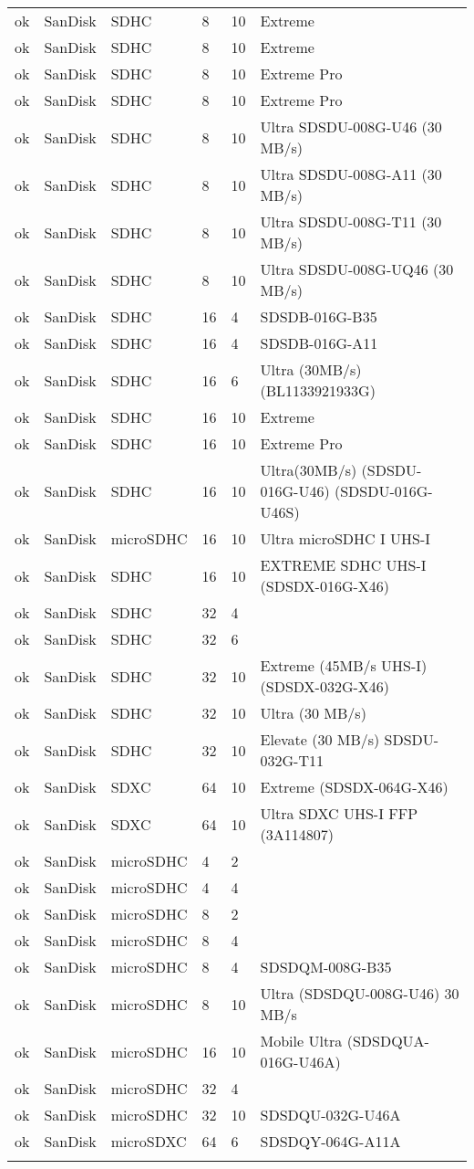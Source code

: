 \begin{longtable}{llllp{}p{}}
  ok&SanDisk&SDHC&8&10&Extreme\\
  ok&SanDisk&SDHC&8&10&Extreme\\
  ok&SanDisk&SDHC&8&10&Extreme Pro\\
  ok&SanDisk&SDHC&8&10&Extreme Pro\\
  ok&SanDisk&SDHC&8&10&Ultra SDSDU-008G-U46 (30 MB/s)\\
  ok&SanDisk&SDHC&8&10&Ultra SDSDU-008G-A11 (30 MB/s)\\
  ok&SanDisk&SDHC&8&10&Ultra SDSDU-008G-T11 (30 MB/s)\\
  ok&SanDisk&SDHC&8&10&Ultra SDSDU-008G-UQ46 (30 MB/s)\\
  ok&SanDisk&SDHC&16&4&SDSDB-016G-B35\\
  ok&SanDisk&SDHC&16&4&SDSDB-016G-A11\\
  ok&SanDisk&SDHC&16&6&Ultra (30MB/s) (BL1133921933G)\\
  ok&SanDisk&SDHC&16&10&Extreme\\
  ok&SanDisk&SDHC&16&10&Extreme Pro\\
  ok&SanDisk&SDHC&16&10&Ultra(30MB/s) (SDSDU-016G-U46) (SDSDU-016G-U46S)\\
  ok&SanDisk&microSDHC&16&10&Ultra microSDHC I UHS-I\\
  ok&SanDisk&SDHC&16&10&EXTREME SDHC UHS-I (SDSDX-016G-X46)\\
  ok&SanDisk&SDHC&32&4\\
  ok&SanDisk&SDHC&32&6\\
  ok&SanDisk&SDHC&32&10&Extreme (45MB/s UHS-I) (SDSDX-032G-X46)\\
  ok&SanDisk&SDHC&32&10&Ultra (30 MB/s)\\
  ok&SanDisk&SDHC&32&10&Elevate (30 MB/s) SDSDU-032G-T11\\
  ok&SanDisk&SDXC&64&10&Extreme (SDSDX-064G-X46)\\
  ok&SanDisk&SDXC&64&10&Ultra SDXC UHS-I FFP (3A114807)\\
  ok&SanDisk&microSDHC&4&2\\
  ok&SanDisk&microSDHC&4&4\\
  ok&SanDisk&microSDHC&8&2\\
  ok&SanDisk&microSDHC&8&4\\
  ok&SanDisk&microSDHC&8&4&SDSDQM-008G-B35\\
  ok&SanDisk&microSDHC&8&10&Ultra (SDSDQU-008G-U46) 30 MB/s\\
  ok&SanDisk&microSDHC&16&10&Mobile Ultra (SDSDQUA-016G-U46A)\\
  ok&SanDisk&microSDHC&32&4\\
  ok&SanDisk&microSDHC&32&10&SDSDQU-032G-U46A\\
  ok&SanDisk&microSDXC&64&6&SDSDQY-064G-A11A\\\hline{}
\end{longtable}

